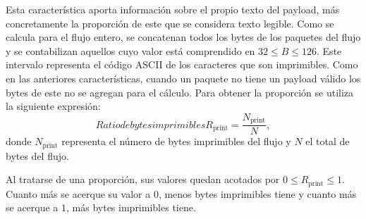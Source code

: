 Esta característica aporta información sobre el propio texto del payload, más concretamente la proporción de este que se considera texto legible. Como se calcula para el flujo entero, se concatenan todos los bytes de los paquetes del flujo y se contabilizan aquellos cuyo valor está comprendido en $32 \leq B \leq 126$. Este intervalo representa el código ASCII de los caracteres que son imprimibles. Como en las anteriores características, cuando un paquete no tiene un payload válido los bytes de este no se agregan para el cálculo. Para obtener la proporción se utiliza la siguiente expresión:
\begin{equation}[eq:ratio-bytes-printables]{Ratio de bytes imprimibles}
R_{\mathrm{print}} = \frac{N_{\mathrm{print}}}{N},
\end{equation}donde $N_{\mathrm{print}}$ representa el número de bytes imprimibles del flujo y $N$ el total de bytes del flujo.

Al tratarse de una proporción, sus valores quedan acotados por $0 \leq R_{\mathrm{print}} \leq 1$. Cuanto más se acerque su valor a $0$, menos bytes imprimibles tiene y cuanto más se acerque a $1$, más bytes imprimibles tiene.

